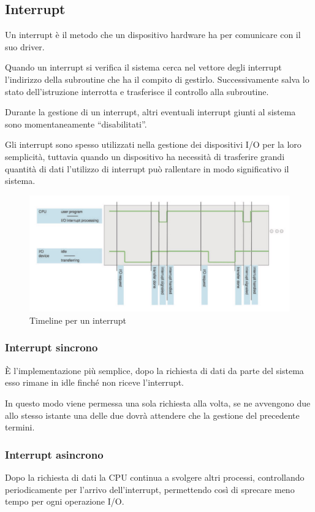 \subsection{Interrupt}
Un interrupt è il metodo che un dispositivo hardware ha per comunicare con il suo driver.

\spacer
Quando un interrupt si verifica il sistema cerca nel vettore degli interrupt l'indirizzo della subroutine che ha il compito di gestirlo.
Successivamente salva lo stato dell'istruzione interrotta e trasferisce il controllo alla subroutine.

\spacer
Durante la gestione di un interrupt, altri eventuali interrupt giunti al sistema sono momentaneamente “disabilitati”.

\spacer
Gli interrupt sono spesso utilizzati nella gestione dei dispositivi I/O per la loro semplicità, tuttavia quando un dispositivo ha necessità di trasferire grandi quantità di dati l'utilizzo di interrupt può rallentare in modo significativo il sistema.

\begin{figure}[H]
    \centering
    \includegraphics[width=0.65\linewidth]{assets/interrupt-timeline}
    \caption{Timeline per un interrupt}
\end{figure}

\subsubsection{Interrupt sincrono}
È l'implementazione più semplice, dopo la richiesta di dati da parte del sistema esso rimane in idle finché non riceve l'interrupt.

In questo modo viene permessa una sola richiesta alla volta, se ne avvengono due allo stesso istante una delle due dovrà attendere che la gestione del precedente termini.

\subsubsection{Interrupt asincrono}
Dopo la richiesta di dati la CPU continua a svolgere altri processi, controllando periodicamente per l'arrivo dell'interrupt, permettendo così di sprecare meno tempo per ogni operazione I/O.

